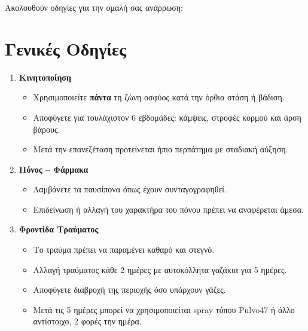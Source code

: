 \documentclass[10pt,greek]{article}
\begin{document}
\begin{PatientInfo}
\end{PatientInfo}

Ακολουθούν οδηγίες για την ομαλή σας ανάρρωση:

\section*{Γενικές Οδηγίες}
\begin{enumerate}[label=\arabic*.]
\setlength{\parskip}{6pt}
  \item \textbf{Κινητοποίηση}
       \begin{itemize}
\item Χρησιμοποιείτε \textbf{πάντα} τη ζώνη οσφύος κατά την όρθια στάση ή βάδιση.
\item Αποφύγετε για τουλάχιστον 6 εβδομάδες: κάμψεις, στροφές κορμού και άρση βάρους.
\item Μετά την επανεξέταση προτείνεται ήπιο περπάτημα με σταδιακή αύξηση.
    \end{itemize}
  \item \textbf{Πόνος -- Φάρμακα}
      \begin{itemize}
\item Λαμβάνετε τα παυσίπονα όπως έχουν συνταγογραφηθεί.
\item Επιδείνωση ή αλλαγή του χαρακτήρα του πόνου πρέπει να αναφέρεται άμεσα.
    \end{itemize}
  \item \textbf{Φροντίδα Τραύματος}
      \begin{itemize}
\item Το τραύμα πρέπει να παραμένει καθαρό και στεγνό.
\item Αλλαγή τραύματος κάθε 2 ημέρες με αυτοκόλλητα γαζάκια για 5 ημέρες.
\item Αποφύγετε διαβροχή της περιοχής όσο υπάρχουν γάζες.
\item Μετά τις 5 ημέρες μπορεί να χρησιμοποιείται spray τύπου Pulvo47 ή άλλο αντίστοιχο, 2 φορές την ημέρα.

\end{itemize}
\end{enumerate}
\end{document}
